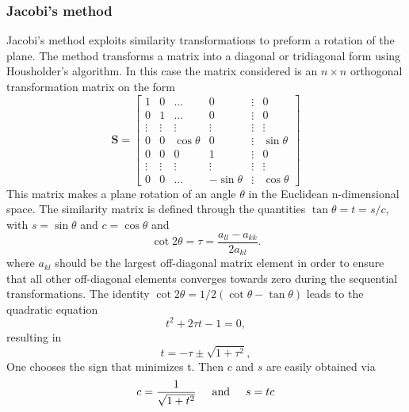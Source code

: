 \documentclass[%
reprint,
amsmath,amssymb,
aps,
]{revtex4-1}
\begin{document}
\subsubsection*{Jacobi's method}  \noindent 
Jacobi's method exploits similarity transformations to preform a rotation of the plane. The method transforms a matrix into a diagonal or tridiagonal form using Housholder's algorithm. In this case the matrix considered is an $n\times n$ orthogonal transformation matrix on the form \vspace{1mm}
\begin{equation*}
\mathbf{S} = \begin{bmatrix}
1 & 0  & \dots & 0 &\vdots &0 \\
0 & 1  & \dots & 0 & \vdots & 0 \\
\vdots & \vdots &\vdots&\vdots&\vdots&\vdots\\
0 & 0 & \cos{\theta} & 0 &\vdots & \sin{\theta} \\
0  & 0 & 0 & 1 &\vdots & 0 \\
 \vdots & \vdots &\vdots&\vdots&\vdots&\vdots\\
 0 & 0 &\dots & -\sin{\theta} & \vdots & \cos{\theta}
\end{bmatrix}
\end{equation*}\vspace{1mm}
\noindent 
This matrix makes a plane rotation of an angle $\theta$ in the Euclidean n-dimensional space. The similarity matrix is defined through the quantities $\tan\theta = t= s/c$, with $s=\sin\theta$ and $c=\cos\theta$ and
\begin{equation*}\cot 2\theta=\tau = \frac{a_{ll}-a_{kk}}{2a_{kl}}.
\end{equation*}
where $a_{kl}$ should be the largest off-diagonal matrix element in order to ensure that all other off-diagonal elements converges towards zero during the sequential transformations. The identity $\cot 2\theta=1/2(\cot \theta-\tan\theta)$ leads to the quadratic equation
\begin{equation*}
t^2+2\tau t-1= 0,
\end{equation*}
resulting in
\begin{equation*}
t = -\tau \pm \sqrt{1+\tau^2},
\end{equation*}
One chooses the sign that minimizes t. Then $c$ and $s$ are easily obtained via
\begin{equation}\label{sc}
c = \frac{1}{\sqrt{1+t^2}} \hspace{5mm}  \textnormal{and} \hspace{5mm} s=tc
\end{equation}  \vspace{2mm}
\end{document}
